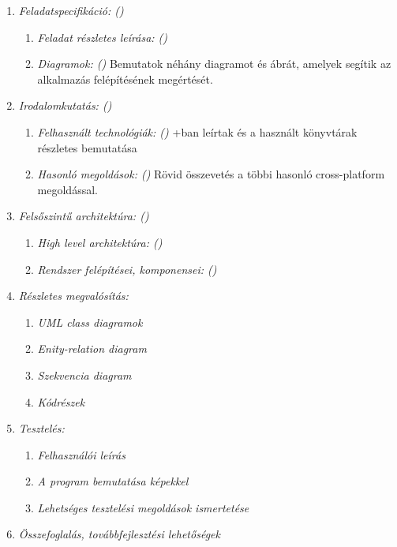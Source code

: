 \begin{enumerate}
	\item \emph{Feladatspecifikáció: ()} 
        \begin{enumerate}
            \item \emph{Feladat részletes leírása: ()} 
            \item \emph{Diagramok: ()} Bemutatok néhány diagramot és ábrát, amelyek segítik az alkalmazás felépítésének megértését.
        \end{enumerate}
	\item \emph{Irodalomkutatás: ()} 
        \begin{enumerate}
            \item \emph{Felhasznált technológiák: ()} \az+ban leírtak és a használt könyvtárak részletes bemutatása 
            \item \emph{Hasonló megoldások: ()} Rövid összevetés a többi hasonló cross-platform megoldással.
        \end{enumerate}
    \item \emph{Felsőszintű architektúra: ()} 
        \begin{enumerate}
            \item \emph{High level architektúra: ()} 
            \item \emph{Rendszer felépítései, komponensei: ()}
        \end{enumerate}
    \item \emph{Részletes megvalósítás:} 
        \begin{enumerate}
            \item \emph{UML class diagramok} 
            \item \emph{Enity-relation diagram}
            \item \emph{Szekvencia diagram}
            \item \emph{Kódrészek}
        \end{enumerate}
    \item \emph{Tesztelés:} 
        \begin{enumerate}
            \item \emph{Felhasználói leírás} 
            \item \emph{A program bemutatása képekkel} 
            \item \emph{Lehetséges tesztelési megoldások ismertetése}
        \end{enumerate}
    \item \emph{Összefoglalás, továbbfejlesztési lehetőségek} 
\end{enumerate}